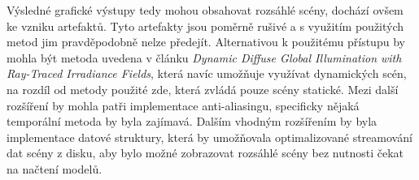 Výsledné grafické výstupy tedy mohou obsahovat rozsáhlé scény, dochází ovšem ke vzniku artefaktů. Tyto artefakty jsou poměrně rušivé a s využitím použitých metod jim pravděpodobně nelze předejít. Alternativou k použitému přístupu by mohla být metoda uvedena v článku \textit{Dynamic Diffuse Global Illumination with Ray-Traced Irradiance Fields}, která navíc umožňuje využívat dynamických scén, na rozdíl od metody použité zde, která zvládá pouze scény statické. Mezi další rozšíření by mohla patři implementace anti-aliasingu, specificky nějaká temporální metoda by byla zajímavá. Dalším vhodným rozšířením by byla implementace datové struktury, která by umožňovala optimalizované streamování dat scény z disku, aby bylo možné zobrazovat rozsáhlé scény bez nutnosti čekat na načtení modelů.



